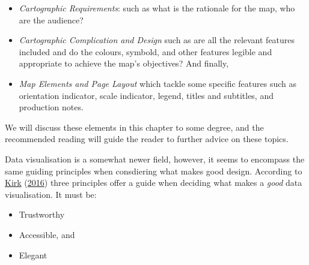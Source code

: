 \documentclass[
]{book}
\providecommand{\tightlist}{%
  \setlength{\itemsep}{0pt}\setlength{\parskip}{0pt}}
\begin{document}
\begin{itemize}
\tightlist
\item
  \emph{Cartographic Requirements}: such as what is the rationale for the map, who are the audience?
\item
  \emph{Cartographic Complication and Design} such as are all the relevant features included and do the colours, symbold, and other features legible and appropriate to achieve the map's objectives? And finally,
\item
  \emph{Map Elements and Page Layout} which tackle some specific features such as orientation indicator, scale indicator, legend, titles and subtitles, and production notes.
\end{itemize}

We will discuss these elements in this chapter to some degree, and the recommended reading will guide the reader to further advice on these topics.

Data visualisation is a somewhat newer field, however, it seems to encompass the same guiding principles when consdiering what makes good design. According to \protect\hyperlink{ref-Kirk_2016}{Kirk} (\protect\hyperlink{ref-Kirk_2016}{2016}) three principles offer a guide when deciding what makes a \emph{good} data visualisation. It must be:

\begin{itemize}
\tightlist
\item
  Trustworthy
\item
  Accessible, and
\item
  Elegant
\end{itemize}
\end{document}
